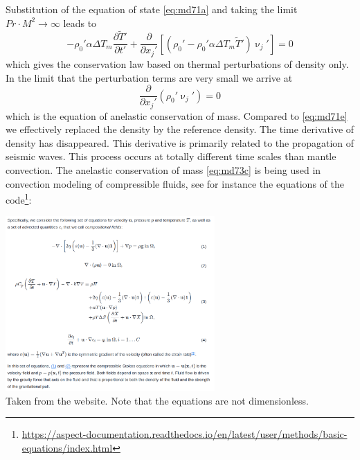 \vspace{0.5cm}


\vspace{0.5cm}

Substitution of the equation of state \eqref{eq:md71a} 
and taking the limit $Pr \cdot M^2 \rightarrow \infty$ leads to
\begin{equation}
-\rho_0' \alpha \Delta T_m \frac{\partial {\tilde T}'  }{\partial t'} + 
\frac{\partial }{\partial x_j'} 
\left[
(\rho_0' - \rho_0' \alpha \Delta T_m {\tilde T}') \upnu_j'
\right] = 0
\label{eq:md73b}
\end{equation}
which gives the conservation law based on thermal perturbations of density only. In the
limit that the perturbation terms are very small we arrive at
\begin{equation}
\frac{\partial }{\partial x_j'} ( \rho_0' \upnu_j' ) =0
\label{eq:md73c}
\end{equation}
which is the equation of anelastic conservation of mass. Compared to \eqref{eq:md71e} we
effectively replaced the density by the reference density. The time derivative of density
has disappeared. This derivative is primarily related to the propagation of seismic waves.
This process occurs at totally different time scales than mantle convection. The anelastic
conservation of mass \eqref{eq:md73c} is being used in convection modeling of compressible fluids,
see for instance the equations of the \aspect code\footnote{\url{https://aspect-documentation.readthedocs.io/en/latest/user/methods/basic-equations/index.html}}:

\begin{center}
\includegraphics[width=8cm]{images/chapter_md/aspect_eqs}\\
{\captionfont Taken from the \aspect website. Note that the equations are not dimensionless.}
\end{center}

